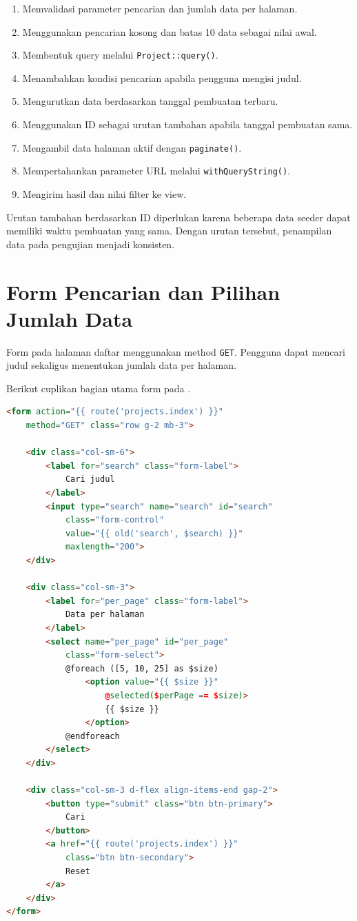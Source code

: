 \documentclass[a4paper,oneside,11pt]{book}
\renewcommand{\_}{\textunderscore\allowbreak{}}
\begin{document}
\begin{enumerate}
    \item Memvalidasi parameter pencarian dan jumlah data per halaman.
    \item Menggunakan pencarian kosong dan batas 10 data sebagai nilai awal.
    \item Membentuk query melalui \texttt{Project::query()}.
    \item Menambahkan kondisi pencarian apabila pengguna mengisi judul.
    \item Mengurutkan data berdasarkan tanggal pembuatan terbaru.
    \item Menggunakan ID sebagai urutan tambahan apabila tanggal pembuatan sama.
    \item Mengambil data halaman aktif dengan \texttt{paginate()}.
    \item Mempertahankan parameter URL melalui \texttt{withQueryString()}.
    \item Mengirim hasil dan nilai filter ke view.
\end{enumerate}

Urutan tambahan berdasarkan ID diperlukan karena beberapa data seeder
dapat memiliki waktu pembuatan yang sama. Dengan urutan tersebut,
penampilan data pada pengujian menjadi konsisten.

\section{Form Pencarian dan Pilihan Jumlah Data}

Form pada halaman daftar menggunakan method \texttt{GET}.
Pengguna dapat mencari judul sekaligus menentukan jumlah data per
halaman.

Berikut cuplikan bagian utama form pada
.

\begin{lstlisting}[language=HTML,caption={Form pencarian dan pilihan jumlah data}]
<form action="{{ route('projects.index') }}"
    method="GET" class="row g-2 mb-3">

    <div class="col-sm-6">
        <label for="search" class="form-label">
            Cari judul
        </label>
        <input type="search" name="search" id="search"
            class="form-control"
            value="{{ old('search', $search) }}"
            maxlength="200">
    </div>

    <div class="col-sm-3">
        <label for="per_page" class="form-label">
            Data per halaman
        </label>
        <select name="per_page" id="per_page"
            class="form-select">
            @foreach ([5, 10, 25] as $size)
                <option value="{{ $size }}"
                    @selected($perPage == $size)>
                    {{ $size }}
                </option>
            @endforeach
        </select>
    </div>

    <div class="col-sm-3 d-flex align-items-end gap-2">
        <button type="submit" class="btn btn-primary">
            Cari
        </button>
        <a href="{{ route('projects.index') }}"
            class="btn btn-secondary">
            Reset
        </a>
    </div>
</form>
\end{lstlisting}
\end{document}
